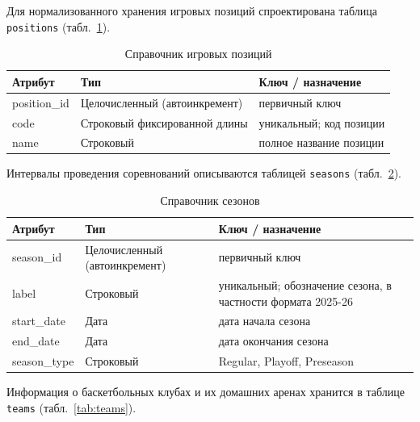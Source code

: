 {\footnotesize\setlength{\tabcolsep}{4pt}\renewcommand{\arraystretch}{1.12}%

{\normalsize
Для нормализованного хранения игровых позиций спроектирована таблица
\texttt{positions} (табл.~\ref{tab:pos}).
}

\begin{table}[H]
\caption{Справочник игровых позиций}
\label{tab:pos}
\centering
\begin{tabular}{|p{}|p{}|p{}|}
\hline
\textbf{Атрибут} & \textbf{Тип} & \textbf{Ключ / назначение} \\
\hline
position\_id & Целочисленный (автоинкремент) & первичный ключ \\
\hline
code & Строковый фиксированной длины & уникальный; код позиции \\
\hline
name & Строковый & полное название позиции \\
\hline
\end{tabular}
\end{table}

{\normalsize
Интервалы проведения соревнований описываются таблицей
\texttt{seasons} (табл.~\ref{tab:seasons}).
}

\begin{table}[H]
\caption{Справочник сезонов}
\label{tab:seasons}
\centering
\begin{tabular}{|p{}|p{}|p{}|}
\hline
\textbf{Атрибут} & \textbf{Тип} & \textbf{Ключ / назначение} \\
\hline
season\_id & Целочисленный (автоинкремент) & первичный ключ \\
\hline
label & Строковый & уникальный; обозначение сезона, в частности формата 2025-26 \\
\hline
start\_date & Дата & дата начала сезона \\
\hline
end\_date & Дата & дата окончания сезона \\
\hline
season\_type & Строковый & Regular, Playoff, Preseason \\
\hline
\end{tabular}
\end{table}

{\normalsize
Информация о баскетбольных клубах и их домашних аренах хранится в таблице
\texttt{teams} (табл.~\ref{tab:teams}).
}

}
